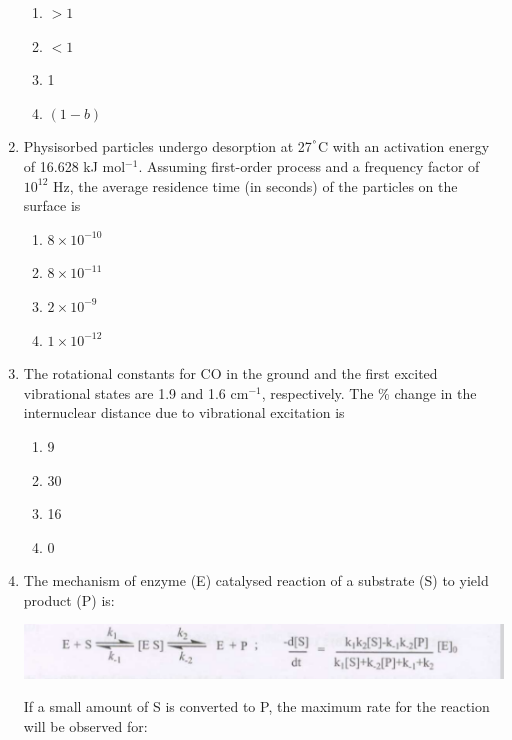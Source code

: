 \documentclass[12pt]{article}
\begin{document}
\begin{enumerate}
\begin{enumerate}
\item $> 1$
\item $< 1$
\item 1
\item $(1 - b)$
\end{enumerate}    \hfill{}




\item Physisorbed particles undergo desorption at 27$^\degree$C with an activation energy of 16.628 kJ mol$^{-1}$. Assuming first-order process and a frequency factor of $10^{12}$ Hz, the average residence time (in seconds) of the particles on the surface is

\begin{enumerate}
\item $8 \times 10^{-10}$
\item $8 \times 10^{-11}$
\item $2 \times 10^{-9}$
\item $1 \times 10^{-12}$
\end{enumerate}    \hfill{}




\item The rotational constants for CO in the ground and the first excited vibrational states are 1.9 and 1.6 cm$^{-1}$, respectively. The \% change in the internuclear distance due to vibrational excitation is

\begin{enumerate}
\item 9
\item 30
\item 16
\item 0
\end{enumerate}    \hfill{}




\item
The mechanism of enzyme (E) catalysed reaction of a substrate (S) to yield product (P) is:

\begin{center}
\includegraphics[width=0.6\columnwidth]{figs/q69.png}
\end{center}

If a small amount of S is converted to P, the maximum rate for the reaction will be observed for:


\end{enumerate}
\end{document}
